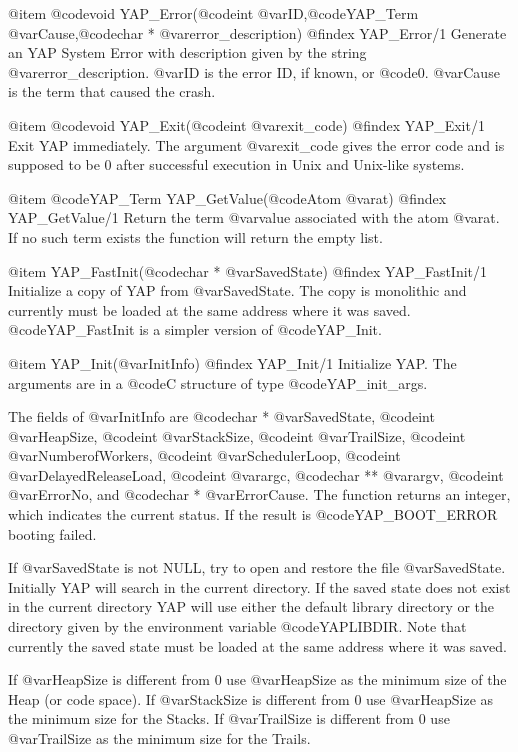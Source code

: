 {{{{{{{{{@item  @code{void} YAP_Error(@code{int} @var{ID},@code{YAP_Term} @var{Cause},@code{char *} @var{error_description})
@findex YAP_Error/1
Generate an YAP System Error with description given by the string
@var{error_description}. @var{ID} is the error ID, if known, or
@code{0}. @var{Cause} is the term that caused the crash.

@item  @code{void} YAP_Exit(@code{int} @var{exit_code})
@findex YAP_Exit/1
Exit YAP immediately. The argument @var{exit_code} gives the error code
and is supposed to be 0 after successful execution in Unix and Unix-like
systems.

@item  @code{YAP_Term} YAP_GetValue(@code{Atom} @var{at})
@findex  YAP_GetValue/1
Return the term @var{value} associated with the atom @var{at}. If no
such term exists the function will return the empty list.

@item  YAP_FastInit(@code{char *} @var{SavedState})
@findex  YAP_FastInit/1
Initialize a copy of YAP from @var{SavedState}. The copy is
monolithic and currently must be loaded at the same address where it was
saved. @code{YAP_FastInit} is a simpler version of @code{YAP_Init}.

@item  YAP_Init(@var{InitInfo})
@findex  YAP_Init/1
Initialize YAP. The arguments are in a @code{C}
structure of type @code{YAP_init_args}.

The fields of @var{InitInfo} are @code{char *} @var{SavedState},
@code{int} @var{HeapSize}, @code{int} @var{StackSize}, @code{int}
@var{TrailSize}, @code{int} @var{NumberofWorkers}, @code{int}
@var{SchedulerLoop}, @code{int} @var{DelayedReleaseLoad}, @code{int}
@var{argc}, @code{char **} @var{argv}, @code{int} @var{ErrorNo}, and
@code{char *} @var{ErrorCause}. The function returns an integer, which
indicates the current status. If the result is @code{YAP_BOOT_ERROR}
booting failed.

If @var{SavedState} is not NULL, try to open and restore the file
@var{SavedState}. Initially YAP will search in the current directory. If
the saved state does not exist in the current directory YAP will use
either the default library directory or the directory given by the
environment variable @code{YAPLIBDIR}. Note that currently
the saved state must be loaded at the same address where it was saved.

If @var{HeapSize} is different from 0 use @var{HeapSize} as the minimum
size of the Heap (or code space). If @var{StackSize} is different from 0
use @var{HeapSize} as the minimum size for the Stacks. If
@var{TrailSize} is different from 0 use @var{TrailSize} as the minimum
size for the Trails.

}}}}}}}}}
